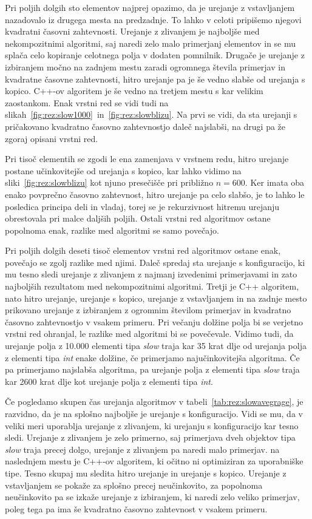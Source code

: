 \documentclass[a4paper,oneside,12pt]{article}
\begin{document}
Pri poljih dolgih sto elementov najprej opazimo, da je urejanje z vstavljanjem
nazadovalo iz drugega mesta na predzadnje. To lahko v celoti pripišemo njegovi
kvadratni časovni zahtevnosti. Urejanje z zlivanjem je najboljše med
nekompozitnimi algoritmi, saj naredi zelo malo primerjanj elementov in se mu
splača celo kopiranje celotnega polja v dodaten pomnilnik. Drugače je urejanje z
izbiranjem močno na zadnjem mestu zaradi ogromnega števila primerjav in
kvadratne časovne zahtevnosti, hitro urejanje pa je še vedno slabše od urejanja s
kopico. \mbox{C++-ov} algoritem je še vedno na tretjem mestu s kar velikim zaostankom.
Enak vrstni red se vidi tudi na
slikah~\ref{fig:rez:slow1000}~in~\ref{fig:rez:slowblizu}. Na prvi se vidi, da
sta urejanji s pričakovano kvadratno časovno zahtevnostjo daleč najslabši, na
drugi pa že zgoraj opisani vrstni red.

Pri tisoč elementih se zgodi le ena zamenjava v vrstnem redu, hitro urejanje
postane učinkovitejše od urejanja s kopico, kar lahko vidimo na
sliki~\ref{fig:rez:slowblizu} kot njuno presečišče pri približno $n = 600$.
Ker imata oba enako povprečno časovno zahtevnost, hitro urejanje pa celo slabšo, je to lahko le posledica
principa deli in vladaj, torej se je rekurzivnost hitremu urejanju obrestovala
pri malce daljših poljih. Ostali vrstni red algoritmov ostane popolnoma enak,
razlike med algoritmi se samo povečajo.

Pri poljih dolgih deseti tisoč elementov vrstni red algoritmov ostane enak,
povečajo se zgolj razlike med njimi. Daleč spredaj sta urejanje s konfiguracijo,
ki mu tesno sledi urejanje z zlivanjem z najmanj izvedenimi primerjavami in zato najboljših
rezultatom med nekompozitnimi algoritmi. Tretji je C++ algoritem, nato hitro urejanje,
urejanje s kopico, urejanje z vstavljanjem in na zadnje mesto prikovano urejanje z izbiranjem z
ogromnim številom primerjav in kvadratno časovno zahtevnostjo v vsakem primeru.
Pri večanju dolžine polja bi se verjetno vrstni red ohranjal, le razlike med
algoritmi bi se povečevale. Vidimo tudi, da urejanje polja z 10.000 elementi
tipa \emph{slow} traja kar 35 krat dlje od urejanja polja z elementi tipa
\emph{int} enake dolžine, če primerjamo najučinkovitejša algoritma. Če pa
primerjamo najslabša algoritma, pa urejanje polja z elementi tipa \emph{slow}
traja kar 2600 krat dlje kot urejanje polja z elementi tipa \emph{int}.

Če pogledamo skupen čas urejanja algoritmov v tabeli~\ref{tab:rez:slowavegrage},
je razvidno, da je na splošno najboljše je urejanje s konfiguracijo. Vidi se mu,
da v veliki meri
uporablja urejanje z zlivanjem, ki urejanju s konfiguracijo kar tesno sledi. 
Urejanje z zlivanjem je zelo primerno, saj primerjava dveh objektov tipa
\emph{slow} traja precej dolgo, urejanje z zlivanjem pa naredi malo primerjav.
na naslednjem mestu  je \mbox{C++-ov}  algoritem, ki očitno ni optimiziran za 
uporabniške tipe. Tesno skupaj mu sledita
hitro urejanje in urejanje s kopico. Urejanje z vstavljanjem se pokaže za
splošno precej neučinkovito, za popolnoma neučinkovito pa se izkaže urejanje z
izbiranjem, ki naredi zelo veliko primerjav, poleg tega pa ima še kvadratno
časovno zahtevnost v vsakem primeru.
\end{document}

